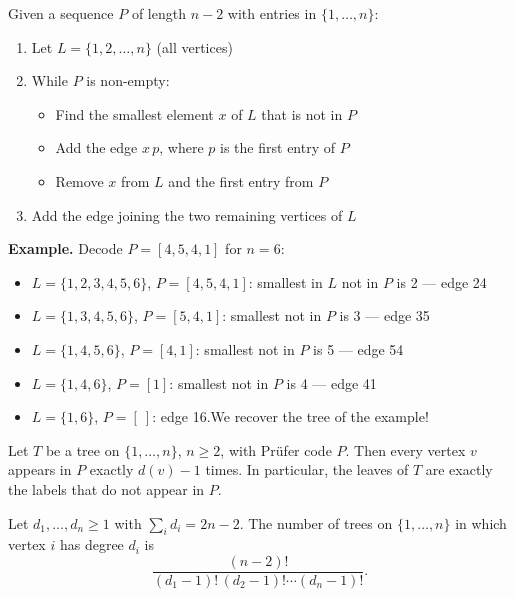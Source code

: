 \documentclass[8pt,a4paper,landscape]{extarticle}
\begin{document}
\begin{cscolumns}
\begin{definition}
Given a sequence $P$ of length $n-2$ with entries in $\{1,\dots,n\}$:
\begin{enumerate}[label=\arabic*.]
\item Let $L=\{1,2,\dots,n\}$ (all vertices)
\item While $P$ is non-empty:
\begin{itemize}
\item Find the smallest element $x$ of $L$ that is not in $P$
\item Add the edge $x\,p$, where $p$ is the first entry of $P$
\item Remove $x$ from $L$ and the first entry from $P$
\end{itemize}
\item Add the edge joining the two remaining vertices of $L$
\end{enumerate}
\end{definition}
\textbf{Example.} Decode $P=[4,5,4,1]$ for $n=6$:
\begin{itemize}
\item $L=\{1,2,3,4,5,6\}$, $P=[4,5,4,1]$: smallest in $L$ not in $P$ is 2 --- edge 24
\item $L=\{1,3,4,5,6\}$, $P=[5,4,1]$: smallest not in $P$ is 3 --- edge 35
\item $L=\{1,4,5,6\}$, $P=[4,1]$: smallest not in $P$ is 5 --- edge 54
\item $L=\{1,4,6\}$, $P=[1]$: smallest not in $P$ is 4 --- edge 41
\item $L=\{1,6\}$, $P=[\ ]$: edge 16.\quad We recover the tree of the example!
\end{itemize}
\begin{theorem}[Lemma]
Let $T$ be a tree on $\{1,\dots,n\}$, $n\ge 2$, with Pr\"ufer code $P$. Then every vertex $v$ appears in $P$ exactly $d(v)-1$ times. In particular, the leaves of $T$ are exactly the labels that do not appear in $P$.
\end{theorem}
\begin{theorem}
Let $d_1,\dots,d_n\ge 1$ with $\sum_i d_i=2n-2$. The number of trees on $\{1,\dots,n\}$ in which vertex $i$ has degree $d_i$ is
\[ \frac{(n-2)!}{(d_1-1)!\,(d_2-1)!\cdots(d_n-1)!}. \]
\end{theorem}


\end{cscolumns}
\end{document}
